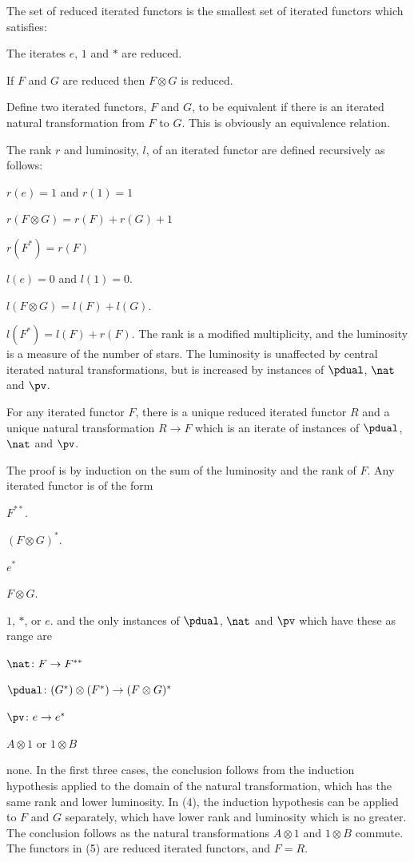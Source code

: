  The set of reduced iterated functors is the
smallest set of iterated functors which satisfies:
\roster
\item The iterates $e$, $1$ and $*$ are reduced.
\item If $F$ and $G$ are reduced then $F\otimes G$ is reduced.
\endroster  
\enddefinition         

Define two iterated functors, $F$ and $G$, to be equivalent if there is an
iterated natural transformation from $F$ to $G$.
This is obviously an equivalence relation.

 The rank $r$ and luminosity, $l$, of an 
iterated functor are defined recursively as follows: 
\roster 
\item $r(e)=1$ and $r(1)=1$
\item $r(F\otimes G)=r(F)+r(G)+1$
\item $r(F^*)=r(F)$
\endroster
\roster 
\item $l(e)=0$ and $l(1)=0$. 
\item $l(F\otimes G)=l(F)+l(G)$. 
\item $l(F^*)=l(F)+r(F)$. 
\endroster 
\enddefinition 
The rank is a modified multiplicity, and the luminosity is a measure of the 
number of stars. The luminosity is unaffected by central iterated natural 
transformations, but is increased by instances of $\pdual$, $\nat$ and $\pv$. 
                                                             
 For any iterated functor $F$, there is a 
unique reduced iterated functor $R$ and a unique natural transformation $R\to 
F$ which is an iterate of instances of $\pdual$, $\nat$ and $\pv$. 
\endproclaim 

 The proof is by induction on the sum of the luminosity and the 
rank of $F$. Any iterated functor is of the form
\roster
\item $F^{**}$.
\item $(F\otimes G)^*$.
\item $e^*$
\item $F\otimes G$.   
\item $1$, $*$, or $e$.
\endroster
and the only instances of $\pdual$, $\nat$ and $\pv$ which have these as range 
are
\roster
\item $\nat\colon F\to F^{**}$
\item $\pdual\colon (G^*)\otimes(F^*)\to(F\otimes G)^*$
\item $\pv\colon e\to e^*$
\item $A\otimes 1$ or $1 \otimes B$
\item none.
\endroster
In the first three cases, the conclusion follows from the induction hypothesis 
applied to the domain of the natural transformation, which has the same rank 
and lower luminosity. In (4), the induction hypothesis can be applied to $F$ 
and $G$ separately, which have lower rank and luminosity which is no greater.
The conclusion follows as the natural transformations $A\otimes 1$ and $1 
\otimes B$ commute. The functors in (5) are reduced iterated functors, and 
$F=R$.
\enddemo

